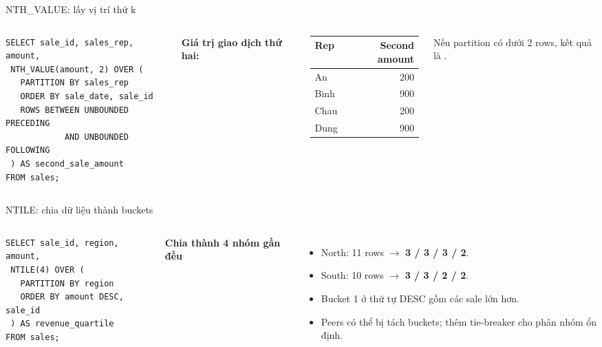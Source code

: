 \documentclass[aspectratio=169,11pt]{beamer}
\newcommand{\code}[1]{{\small\ttfamily\detokenize{#1}}}
\begin{document}
\begin{frame}[fragile]{NTH\_VALUE: lấy vị trí thứ k}
\begin{columns}[T,onlytextwidth]
\begin{lstlisting}[basicstyle=\ttfamily\fontsize{7.9}{9.1}\selectfont]
SELECT sale_id, sales_rep, amount,
 NTH_VALUE(amount, 2) OVER (
   PARTITION BY sales_rep
   ORDER BY sale_date, sale_id
   ROWS BETWEEN UNBOUNDED PRECEDING
            AND UNBOUNDED FOLLOWING
 ) AS second_sale_amount
FROM sales;
\end{lstlisting}

\textbf{Giá trị giao dịch thứ hai:}
\begin{center}
\renewcommand{\arraystretch}{1.18}
\begin{tabular}{lr}
\toprule
Rep & Second amount \\
\midrule
An & 200 \\
Binh & 900 \\
Chau & 200 \\
Dung & 900 \\
\bottomrule
\end{tabular}
\end{center}\small Nếu partition có dưới 2 rows, kết quả là \code{NULL}.
\end{columns}
\end{frame}

\begin{frame}[fragile]{NTILE: chia dữ liệu thành buckets}
\begin{columns}[T,onlytextwidth]
\begin{lstlisting}[basicstyle=\ttfamily\fontsize{8.7}{9.899999999999999}\selectfont]
SELECT sale_id, region, amount,
 NTILE(4) OVER (
   PARTITION BY region
   ORDER BY amount DESC, sale_id
 ) AS revenue_quartile
FROM sales;
\end{lstlisting}

\textbf{Chia thành 4 nhóm gần đều}\par
\vspace{.4em}
\begin{itemize}
\item North: 11 rows $\to$ \textbf{3 / 3 / 3 / 2}.
\item South: 10 rows $\to$ \textbf{3 / 3 / 2 / 2}.
\item Bucket 1 ở thứ tự DESC gồm các sale lớn hơn.
\item Peers có thể bị tách buckets; thêm tie-breaker cho phân nhóm ổn định.
\end{itemize}

\end{columns}
\end{frame}
\end{document}
